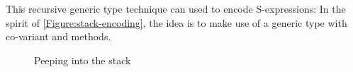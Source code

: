 This recursive generic type technique can used to encode S-expressions: In the spirit of 
  \cref{Figure:stack-encoding}, the idea is to make use of a  generic type
  with co-variant  and  methods. 

\begin{figure}[htb]%
  \caption{Peeping into the stack}%
  \label{Figure:peep}%
\end{figure}
